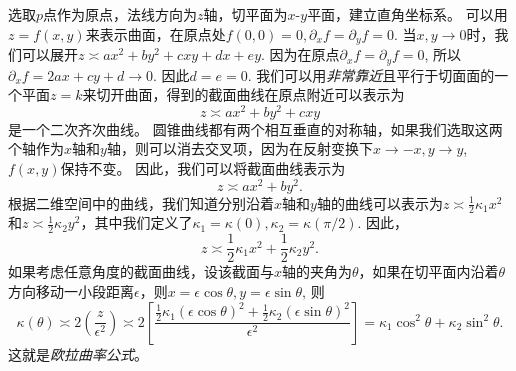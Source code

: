 \documentclass{article}
\begin{document}
选取$p$点作为原点，法线方向为$z$轴，切平面为$x$-$y$平面，建立直角坐标系。
可以用$z=f(x,y)$来表示曲面，在原点处$f(0,0)=0, \partial_{x}f=\partial_{y}f=0$.
当$x, y\rightarrow 0$时，我们可以展开$z\asymp ax^{2}+by^{2}+cxy+dx+ey$.
因为在原点$\partial_{x}f=\partial_{y}f=0$, 所以$\partial_{x}f=2ax+cy+d\rightarrow 0$.
因此$d=e=0$.
我们可以用\emph{非常靠近}且平行于切面面的一个平面$z=k$来切开曲面，得到的截面曲线在原点附近可以表示为
\begin{equation}
    z\asymp ax^{2}+by^{2}+cxy
\end{equation}
是一个二次齐次曲线。
圆锥曲线都有两个相互垂直的对称轴，如果我们选取这两个轴作为$x$轴和$y$轴，则可以消去交叉项，因为在反射变换下$x\rightarrow -x, y\rightarrow y$, $f(x,y)$保持不变。
因此，我们可以将截面曲线表示为
\begin{equation}
    z\asymp ax^{2}+by^{2}.
\end{equation}
根据二维空间中的曲线，我们知道分别沿着$x$轴和$y$轴的曲线可以表示为$z\asymp \frac{1}{2}\kappa_{1}x^{2}$和$z\asymp \frac{1}{2}\kappa_{2}y^{2}$，其中我们定义了$\kappa_{1}=\kappa(0), \kappa_{2}=\kappa(\pi/2)$.
因此，
\begin{equation}
    z\asymp \frac{1}{2}\kappa_{1}x^{2}+\frac{1}{2}\kappa_{2}y^{2}.
\end{equation}
如果考虑任意角度的截面曲线，设该截面与$x$轴的夹角为$\theta$，如果在切平面内沿着$\theta$方向移动一小段距离$\epsilon$，则$x=\epsilon\cos\theta, y=\epsilon\sin\theta$, 则
\begin{equation}
    \kappa(\theta)
    \asymp 2\left(\frac{z}{\epsilon^{2}}\right)
    \asymp 2\left[\frac{\frac{1}{2}\kappa_{1}(\epsilon\cos\theta)^{2}+\frac{1}{2}\kappa_{2}(\epsilon\sin\theta)^{2}}{\epsilon^{2}}\right]
    =\kappa_{1}\cos^{2}\theta+\kappa_{2}\sin^{2}\theta.
\end{equation}
这就是\emph{欧拉曲率公式}。

%
%
\end{document}

